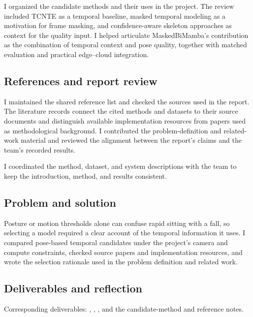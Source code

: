 \documentclass[conference,a4paper]{IEEEtran}
\newenvironment{evidence}{\par\smallskip\begingroup\footnotesize\raggedright\noindent}{\par\endgroup}
\begin{document}
I organized the candidate methods and their uses in the project. The review included TCNTE as a temporal baseline, masked temporal modeling as a motivation for frame masking, and confidence-aware skeleton approaches as context for the quality input. I helped articulate MaskedBiMamba's contribution as the combination of temporal context and pose quality, together with matched evaluation and practical edge--cloud integration.

\subsection{References and report review}

I maintained the shared reference list and checked the sources used in the report. The literature records connect the cited methods and datasets to their source documents and distinguish available implementation resources from papers used as methodological background. I contributed the problem-definition and related-work material and reviewed the alignment between the report's claims and the team's recorded results.

I coordinated the method, dataset, and system descriptions with the team to keep the introduction, method, and results consistent.

\subsection{Problem and solution}

Posture or motion thresholds alone can confuse rapid sitting with a fall, so selecting a model required a clear account of the temporal information it uses. I compared pose-based temporal candidates under the project's camera and compute constraints, checked source papers and implementation resources, and wrote the selection rationale used in the problem definition and related work.

\subsection{Deliverables and reflection}

\begin{evidence}
Corresponding deliverables: , , , and the candidate-method and reference notes.
\end{evidence}
\end{document}
